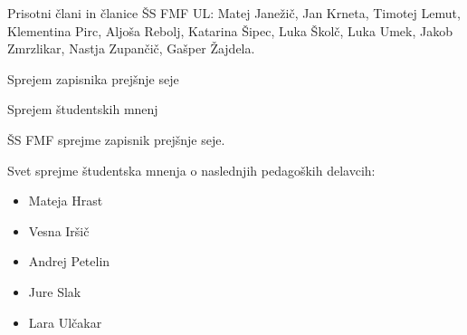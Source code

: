 \documentclass{seja}
\begin{document}
Prisotni člani in članice ŠS FMF UL:
Matej Janežič,
Jan Krneta,
Timotej Lemut,
Klementina Pirc,
Aljoša Rebolj,
Katarina Šipec,
Luka Školč,
Luka Umek,
Jakob Zmrzlikar,
Nastja Zupančič,
Gašper Žajdela.

\begin{red}
	\item
	Sprejem zapisnika prejšnje seje
    \item
    Sprejem študentskih mnenj

\end{red}

\begin{ad}
    \item
    \begin{sklep*}
        ŠS FMF sprejme zapisnik prejšnje seje.
    \end{sklep*}
    
    \item
    \begin{sklep*}
    Svet sprejme študentska mnenja o naslednjih pedagoških delavcih:
    \begin{itemize}
        \item Mateja Hrast
        \item Vesna Iršič
        \item Andrej Petelin
        \item Jure Slak
        \item Lara Ulčakar
    \end{itemize}
    \end{sklep*}
\end{ad}
\makeatletter \global\let\@enddocumenthook\@empty \makeatother
{}
\end{document}
